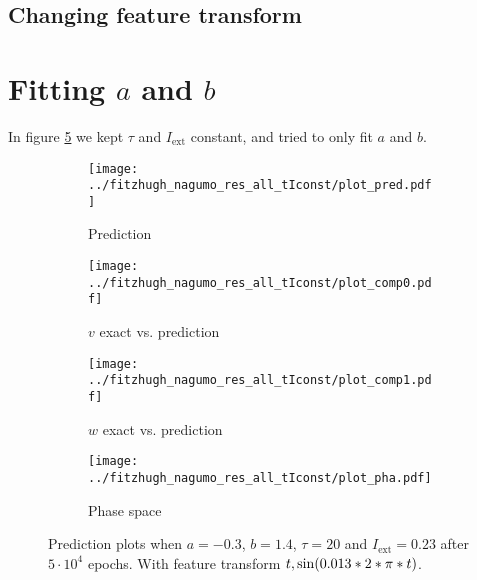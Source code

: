 \documentclass[a4paper]{article}
\begin{document}
\subsection{Changing feature transform}





\section{Fitting $a$ and $b$}

In figure \ref{plot:ab0} we kept $\tau$ and $I_{\text{ext}}$ constant, and tried to only fit $a$ and $b$.

\begin{figure}[H]
	\centering 
	\begin{subfigure}[b]{0.47\textwidth}
		\centering
		\texttt{[image: ../fitzhugh\_nagumo\_res\_all\_tIconst/plot\_pred.pdf]}
		\caption{Prediction}
		\label{fig:ab0a}
	\end{subfigure}
	\begin{subfigure}[b]{0.47\textwidth}
		\centering
		\texttt{[image: ../fitzhugh\_nagumo\_res\_all\_tIconst/plot\_comp0.pdf]}
		\caption{$v$ exact vs. prediction}
		\label{fig:ab0b}
	\end{subfigure}
	\begin{subfigure}[b]{0.47\textwidth}
		\centering
		\texttt{[image: ../fitzhugh\_nagumo\_res\_all\_tIconst/plot\_comp1.pdf]}
		\caption{$w$ exact vs. prediction}
		\label{fig:ab0c}
	\end{subfigure}
	\begin{subfigure}[b]{0.47\textwidth}
		\centering
		\texttt{[image: ../fitzhugh\_nagumo\_res\_all\_tIconst/plot\_pha.pdf]}
		\caption{Phase space}
		\label{fig:ab0d}
	\end{subfigure}
	\caption{Prediction plots when $a=-0.3$, $b=1.4$, $\tau=20$ and $ I_{\text{ext}}=0.23$ after $5\cdot10^4$ epochs. With feature transform $t, \sin(0.013*2*\\\pi*t)$.}
	\label{plot:ab0}
\end{figure}
\end{document}
